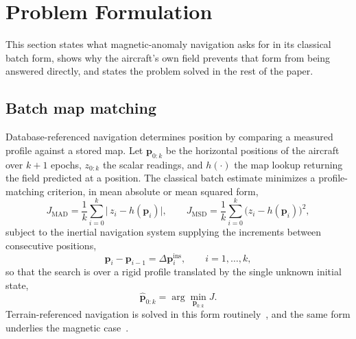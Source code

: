 
\section{Problem Formulation}\label{sec:problem}
This section states what magnetic-anomaly navigation asks for in its classical
batch form, shows why the aircraft's own field prevents that form from being
answered directly, and states the problem solved in the rest of the paper.

\subsection{Batch map matching}\label{sec:batchmm}
Database-referenced navigation determines position by comparing a measured
profile against a stored map. Let $\mathbf{p}_{0:k}$ be the horizontal positions
of the aircraft over $k+1$ epochs, $z_{0:k}$ the scalar readings, and
$h(\cdot)$ the map lookup returning the field predicted at a position. The
classical batch estimate minimizes a profile-matching criterion, in mean
absolute or mean squared form,
\begin{equation}
J_{\mathrm{MAD}}=\frac{1}{k}\sum_{i=0}^{k}\big|\,z_i-h(\mathbf{p}_i)\big|,
\qquad
J_{\mathrm{MSD}}=\frac{1}{k}\sum_{i=0}^{k}\big(z_i-h(\mathbf{p}_i)\big)^{2},
\label{eq:mad}
\end{equation}
subject to the inertial navigation system supplying the increments between
consecutive positions,
\begin{equation}
\mathbf{p}_i-\mathbf{p}_{i-1}=\Delta\mathbf{p}^{\mathrm{ins}}_i,
\qquad i=1,\dots,k,
\label{eq:inshard}
\end{equation}
so that the search is over a rigid profile translated by the single unknown
initial state,
\begin{equation}
\hat{\mathbf{p}}_{0:k}=\arg\min_{\mathbf{p}_{0:k}} J .
\label{eq:batchmm}
\end{equation}
Terrain-referenced navigation is solved in this form
routinely~\cite{hollowell1990,cowie2008}, and the same form underlies the
magnetic case~\cite{canciani2016,canciani2017}.

